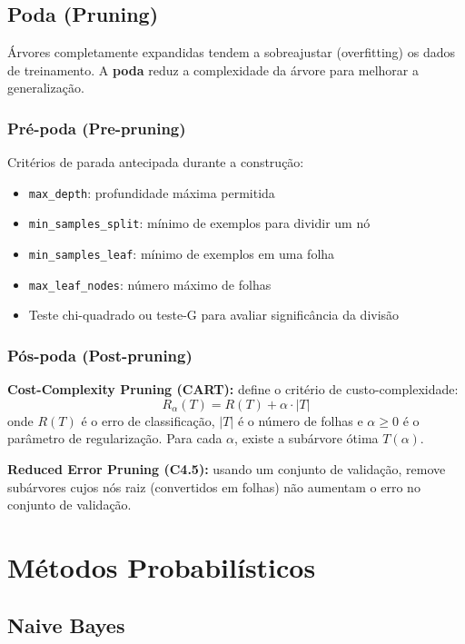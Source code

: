 \documentclass[12pt,a4paper]{article}
\begin{document}
\subsection{Poda (Pruning)}

Árvores completamente expandidas tendem a sobreajustar (overfitting) os dados de treinamento. A \textbf{poda} reduz a complexidade da árvore para melhorar a generalização.

\subsubsection{Pré-poda (Pre-pruning)}
Critérios de parada antecipada durante a construção:
\begin{itemize}
  \item \texttt{max\_depth}: profundidade máxima permitida
  \item \texttt{min\_samples\_split}: mínimo de exemplos para dividir um nó
  \item \texttt{min\_samples\_leaf}: mínimo de exemplos em uma folha
  \item \texttt{max\_leaf\_nodes}: número máximo de folhas
  \item Teste chi-quadrado ou teste-G para avaliar significância da divisão
\end{itemize}

\subsubsection{Pós-poda (Post-pruning)}

\textbf{Cost-Complexity Pruning (CART):} define o critério de custo-complexidade:
\[
  R_\alpha(T) = R(T) + \alpha \cdot |T|
\]
onde $R(T)$ é o erro de classificação, $|T|$ é o número de folhas e $\alpha \geq 0$ é o parâmetro de regularização. Para cada $\alpha$, existe a subárvore ótima $T(\alpha)$.

\textbf{Reduced Error Pruning (C4.5):} usando um conjunto de validação, remove subárvores cujos nós raiz (convertidos em folhas) não aumentam o erro no conjunto de validação.

\section{Métodos Probabilísticos}

\subsection{Naive Bayes}
\end{document}
